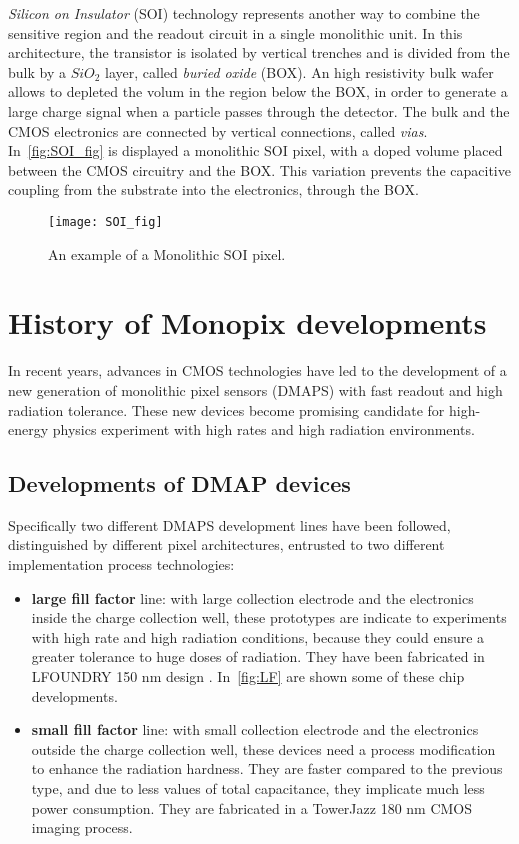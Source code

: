 \textit{Silicon on Insulator} (SOI) technology represents another way to combine the sensitive region and the readout circuit in a single monolithic unit. In this architecture, the transistor is isolated by vertical trenches and is divided from the bulk by a $SiO_{2}$ layer, called \emph{buried oxide} (BOX).
An high resistivity bulk wafer allows to depleted the volum in the region below the BOX, in order to generate a large charge signal when a particle passes through the detector. The bulk and the CMOS electronics are connected by vertical connections, called \textit{vias}. \\
In~\autoref{fig:SOI_fig} is displayed a monolithic SOI pixel, with a doped volume placed between the CMOS circuitry and the BOX. This variation prevents the capacitive coupling from the substrate into the electronics, through the BOX.

\begin{figure}[h!]
\centering
\texttt{[image: SOI\_fig]}
\caption{An example of a Monolithic SOI pixel.}
\label{fig:SOI_fig}
\end{figure}


\section{History of Monopix developments}

In recent years, advances in CMOS technologies have led to the development of a new generation of monolithic pixel sensors (DMAPS) with fast readout and high radiation tolerance. These new devices become promising candidate for high-energy physics experiment with high rates and high radiation environments.


\subsection{Developments of DMAP devices}

Specifically two different DMAPS development lines have been followed, distinguished by different pixel architectures, entrusted to two different implementation process technologies:


\begin{itemize}
\item \textbf{large fill factor} line: with large collection electrode and the electronics inside the charge collection well, these prototypes are indicate to experiments with high rate and high radiation conditions, because they could ensure a greater tolerance to huge doses of radiation. They have been fabricated in LFOUNDRY 150 nm design \cite{Barbero:2019bkw}. In~\autoref{fig:LF} are shown some of these chip developments.
\item \textbf{small fill factor} line: with small collection electrode and the electronics outside the charge collection well, these devices need a process modification to enhance the radiation hardness. They are faster compared to the previous type, and due to less values of total capacitance, they implicate much less power consumption. They are fabricated in a TowerJazz 180 nm CMOS imaging process.
\end{itemize}

